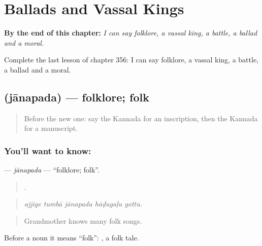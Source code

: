 
\chapter{Ballads and Vassal Kings}
\label{ch:ka-ballads-and-vassal-kings}

\begin{chapteropening}
\textbf{By the end of this chapter:} \emph{I can say folklore, a vassal king, a battle, a ballad and a moral.}

Complete the last lesson of chapter 356: I can say folklore, a vassal king, a battle, a ballad and a moral.
\end{chapteropening}

\section[\texorpdfstring{\kn{ಜಾನಪದ} (jānapada)}{ಜಾನಪದ (jānapada)}]{ (jānapada) — folklore; folk}

\label{lesson:KA-C356-janapada}



\begin{quote}
Before the new one: say the Kannada for an inscription, then the Kannada for a manuscript.
\end{quote}

\subsection*{You'll want to know: }
\textbf{} — \emph{jānapada} — \textquotedblleft{}folklore; folk\textquotedblright{}.

\begin{quote}
    .
\end{quote}

\begin{quote}
\emph{ajjige tumbā jānapada hāḍugaḷu gottu.}
\end{quote}

\begin{quote}
Grandmother knows many folk songs.
\end{quote}

Before a noun it means \textquotedblleft{}folk\textquotedblright{}:  , a folk tale.

